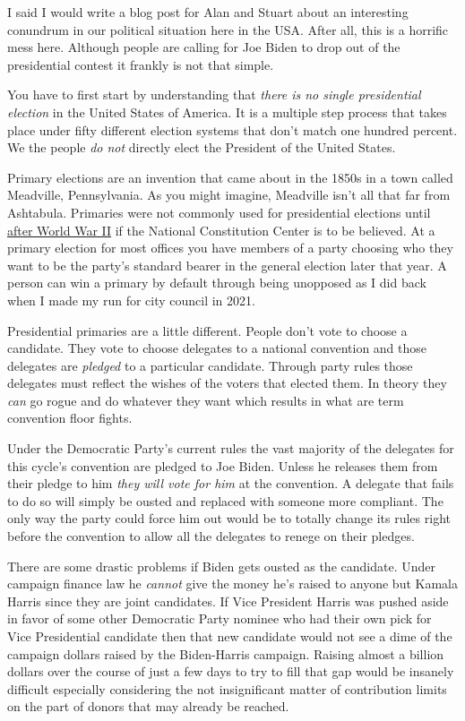 I said I would write a blog post for Alan and Stuart about an
interesting conundrum in our political situation here in the USA. After
all, this is a horrific mess here. Although people are calling for Joe
Biden to drop out of the presidential contest it frankly is not that
simple.

You have to first start by understanding that \emph{there is no single
presidential election} in the United States of America. It is a multiple
step process that takes place under fifty different election systems
that don't match one hundred percent. We the people \emph{do not}
directly elect the President of the United States.

Primary elections are an invention that came about in the 1850s in a
town called Meadville, Pennsylvania. As you might imagine, Meadville
isn't all that far from Ashtabula. Primaries were not commonly used for
presidential elections until
\href{https://constitutioncenter.org/blog/a-brief-history-of-presidential-primaries}{after
World War II} if the National Constitution Center is to be believed. At
a primary election for most offices you have members of a party choosing
who they want to be the party's standard bearer in the general election
later that year. A person can win a primary by default through being
unopposed as I did back when I made my run for city council in 2021.

Presidential primaries are a little different. People don't vote to
choose a candidate. They vote to choose delegates to a national
convention and those delegates are \emph{pledged} to a particular
candidate. Through party rules those delegates must reflect the wishes
of the voters that elected them. In theory they \emph{can} go rogue and
do whatever they want which results in what are term convention floor
fights.

Under the Democratic Party's current rules the vast majority of the
delegates for this cycle's convention are pledged to Joe Biden. Unless
he releases them from their pledge to him \emph{they will vote for him}
at the convention. A delegate that fails to do so will simply be ousted
and replaced with someone more compliant. The only way the party could
force him out would be to totally change its rules right before the
convention to allow all the delegates to renege on their pledges.

There are some drastic problems if Biden gets ousted as the candidate.
Under campaign finance law he \emph{cannot} give the money he's raised
to anyone but Kamala Harris since they are joint candidates. If Vice
President Harris was pushed aside in favor of some other Democratic
Party nominee who had their own pick for Vice Presidential candidate
then that new candidate would not see a dime of the campaign dollars
raised by the Biden-Harris campaign. Raising almost a billion dollars
over the course of just a few days to try to fill that gap would be
insanely difficult especially considering the not insignificant matter
of contribution limits on the part of donors that may already be
reached.


